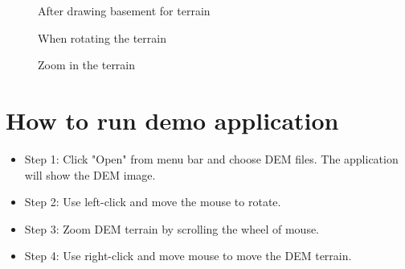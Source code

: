 \documentclass[11pt]{article}
\begin{document}
\begin{itemize}
\begin{figure}[H]
  \caption{After drawing basement for terrain}
\end{figure}
\begin{figure}[H] 
  \caption{When rotating the terrain}
\end{figure}
\begin{figure}[H] 
  \caption{Zoom in the terrain}
\end{figure}

\end{itemize}

\section{How to run demo application}
\begin{itemize}
\item Step 1: Click "Open" from menu bar and choose DEM files. The application will show the DEM image.

\item Step 2: Use left-click and move the mouse to rotate.

\item Step 3: Zoom DEM terrain by scrolling the wheel of mouse.

\item Step 4: Use right-click and move mouse to move the DEM terrain.
\end{itemize}
\end{document}

